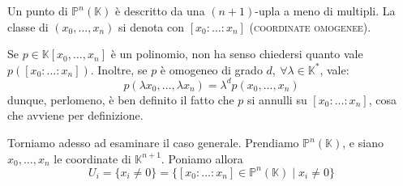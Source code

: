 \begin{defn}
Un punto di $\mathbb{P}^n(\mathbb{K})$ è descritto da una $(n+1)$-upla a meno di multipli. La classe di $(x_0,\dots,x_n)$ si denota con $[x_0: \dots:x_n]$ (\textsc{coordinate omogenee}).
\end{defn}

\begin{oss}
Se $p \in \mathbb{K}[x_0,\dots,x_n]$ è un polinomio, non ha senso chiedersi quanto vale $p([x_0: \dots:x_n])$. Inoltre, se $p$ è omogeneo di grado $d,\ \forall \lambda \in \mathbb{K}^*$, vale:
$$p(\lambda x_0,\dots,\lambda x_n)=\lambda ^d p(x_0,\dots,x_n)$$
dunque, perlomeno, è ben definito il fatto che $p$ si annulli su $[x_0: \dots:x_n]$, cosa che avviene per definizione.
\end{oss}

Torniamo adesso ad esaminare il caso generale. Prendiamo $\mathbb{P}^n(\mathbb{K})$, e siano $x_0,\dots,x_n$ le coordinate di $\mathbb{K}^{n+1}$. Poniamo allora
$$U_i=\{x_i \neq 0\}=\{[x_0: \dots : x_n] \in \mathbb{P}^n(\mathbb{K}) \mid x_i \neq 0\}$$

